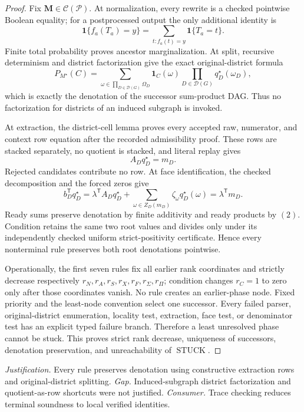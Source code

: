 \documentclass{article}
\begin{document}
\begin{proof}
Fix \(\mathbf M\in\mathcal C(\mathcal P)\).  At normalization, every rewrite is a checked pointwise Boolean equality; for a postprocessed output the only additional identity is
\[
\mathbf 1\{f_a(T_a)=y\}
=\sum_{t:f_a(t)=y}\mathbf 1\{T_a=t\}.
\tag{1}
\]
Finite total probability proves ancestor marginalization.  At split, recursive determinism and district factorization give the exact original-district formula
\[
P_{M^\star}(C)=
\sum_{\omega\in\prod_{D\in\mathcal D(G)}\Omega_D}
\mathbf 1_C(\omega)
\prod_{D\in\mathcal D(G)}q_D^\star(\omega_D),
\tag{2}
\]
which is exactly the denotation of the successor sum-product DAG.  Thus no factorization for districts of an induced subgraph is invoked.

At extraction, the district-cell lemma proves every accepted raw, numerator, and context row equation after the recorded admissibility proof.  These rows are stacked separately, no quotient is stacked, and literal replay gives
\[
A_Dq_D^\star=m_D.
\tag{3}
\]
Rejected candidates contribute no row.  At face identification, the checked decomposition and the forced zeros give
\[
b_D^{\mathsf T}q_D^\star
=\lambda^{\mathsf T}A_Dq_D^\star
+\sum_{\omega\in Z_D(m_D)}\zeta_\omega q_D^\star(\omega)
=\lambda^{\mathsf T}m_D.
\tag{4}
\]
Ready sums preserve denotation by finite additivity and ready products by \((2)\).  Condition retains the same two root values and divides only under its independently checked uniform strict-positivity certificate.  Hence every nonterminal rule preserves both root denotations pointwise.

Operationally, the first seven rules fix all earlier rank coordinates and strictly decrease respectively \(r_N,r_A,r_S,r_X,r_F,r_\Sigma,r_\Pi\); condition changes \(r_C=1\) to zero only after those coordinates vanish.  No rule creates an earlier-phase node.  Fixed priority and the least-node convention select one successor.  Every failed parser, original-district enumeration, locality test, extraction, face test, or denominator test has an explicit typed failure branch.  Therefore a least unresolved phase cannot be stuck.  This proves strict rank decrease, uniqueness of successors, denotation preservation, and unreachability of \(\operatorname{STUCK}\).
\end{proof}
\par\smallskip\noindent \textit{Justification.} Every rule preserves denotation using constructive extraction rows and original-district splitting. \textit{Gap.} Induced-subgraph district factorization and quotient-as-row shortcuts were not justified. \textit{Consumer.} Trace checking reduces terminal soundness to local verified identities.
\end{document}
